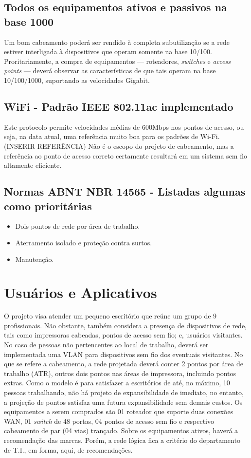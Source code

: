 \documentclass[	DIV=calc,%
							paper=a4,%
							fontsize=12pt,%
							onecolumn]{scrartcl}	 					%
\begin{document}
\subsection{Todos os equipamentos ativos e passivos na base 1000}
Um bom cabeamento poderá ser rendido à completa subutilização se a rede estiver interligada à dispositivos que operam somente na base 10/100. Proritariamente, a compra de equipamentos --- roteadores, \textit{switches} e \textit{access points} --- deverá observar as características de que tais operam na base 10/100/1000, suportando as velocidades Gigabit.

\subsection{WiFi - Padrão IEEE 802.11ac implementado}
Este protocolo permite velocidades médias de 600Mbps nos pontos de acesso, ou seja, na data atual, uma referência muito boa para os padrões de Wi-Fi. (INSERIR REFERÊNCIA) Não é o escopo do projeto de cabeamento, mas a referência ao ponto de acesso correto certamente resultará em um sistema sem fio altamente eficiente.

\subsection{Normas ABNT NBR 14565 - Listadas algumas como prioritárias}
\begin{itemize}
	\item Dois pontos de rede por área de trabalho. \cite{abnt14565}
	\item Aterramento isolado e proteção contra surtos. \cite{abnt14565}
	\item Manutenção. \cite{abnt14565}
	
\end{itemize}


\section{Usuários e Aplicativos}
O projeto visa atender um pequeno escritório que reúne um grupo de 9 profissionais. Não obstante, também considera a presença de dispositivos de rede, tais como impressoras cabeadas, pontos de acesso sem fio; e, usuários visitantes. No caso de pessoas não pertencentes ao local de trabalho, deverá ser implementada uma VLAN para dispositivos sem fio dos eventuais visitantes. No que se refere a cabeamento, a rede projetada deverá conter 2 pontos por área de trabalho (ATR), outros dois pontos nas áreas de impressora, incluindo pontos extras. Como o modelo é para satisfazer a escritórios de até, no máximo, 10 pessoas trabalhando, não há projeto de expansibilidade de imediato, no entanto, a projeção de pontos satisfaz uma futura expansibilidade sem demais custos. Os equipamentos a serem comprados são 01 roteador que suporte duas conexões WAN, 01 \textit{switch} de 48 portas, 04 pontos de acesso sem fio e respectivo cabeamento de par (04 vias) trançado. Sobre os equipamentos ativos, haverá a recomendação das marcas. Porém, a rede lógica fica a critério do departamento de T.I., em forma, aqui, de recomendações.
\end{document}
